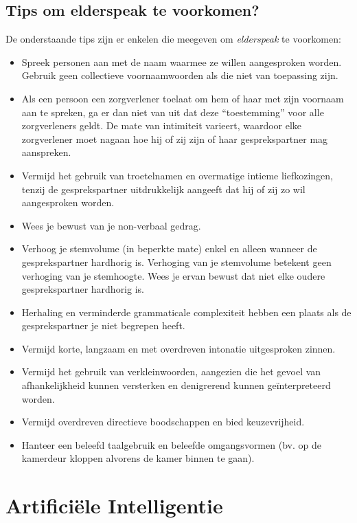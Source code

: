 \subsection{Tips om elderspeak te voorkomen?}

De onderstaande tips zijn er enkelen die \textcite{Wick2007} meegeven om \textit{elderspeak} te voorkomen:

\begin{itemize}
    \item Spreek personen aan met de naam waarmee ze willen aangesproken worden. Gebruik geen collectieve voornaamwoorden als die niet van toepassing zijn.
    \item Als een persoon een zorgverlener toelaat om hem of haar met zijn voornaam aan te spreken, ga er dan niet van uit dat deze “toestemming” voor alle zorgverleners geldt. De mate van intimiteit varieert, waardoor elke zorgverlener moet nagaan hoe hij of zij zijn of haar gesprekspartner mag aanspreken.
    \item Vermijd het gebruik van troetelnamen en overmatige intieme liefkozingen, tenzij de gesprekspartner uitdrukkelijk aangeeft dat hij of zij zo wil aangesproken worden.
    \item Wees je bewust van je non-verbaal gedrag.
    \item Verhoog je stemvolume (in beperkte mate) enkel en alleen wanneer de gesprekspartner hardhorig is. Verhoging van je stemvolume betekent geen verhoging van je stemhoogte. Wees je ervan bewust dat niet elke oudere gesprekspartner hardhorig is.
    \item Herhaling en verminderde grammaticale complexiteit hebben een plaats als de gesprekspartner je niet begrepen heeft.
    \item Vermijd korte, langzaam en met overdreven intonatie uitgesproken zinnen.
    \item Vermijd het gebruik van verkleinwoorden, aangezien die het gevoel van afhankelijkheid kunnen versterken en denigrerend kunnen geïnterpreteerd worden.
    \item Vermijd overdreven directieve boodschappen en bied keuzevrijheid.
    \item Hanteer een beleefd taalgebruik en beleefde omgangsvormen (bv. op de kamerdeur kloppen alvorens de kamer binnen te gaan).
\end{itemize}

\clearpage

\section{Artificiële Intelligentie}
